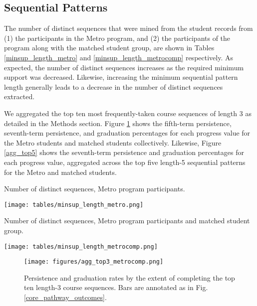 \documentclass[conference]{IEEEtran}
\begin{document}
\subsection{Sequential Patterns}

The number of distinct sequences that were mined from the student records from (1) the participants in the Metro program, and (2) the participants of the program along with the matched student group, are shown in Tables \ref{minsup_length_metro} and \ref{minsup_length_metrocomp} respectively. As expected, the number of distinct sequences increases as the required minimum support was decreased.  Likewise, increasing the minimum sequential pattern length generally leads to a decrease in the number of distinct sequences extracted.   

We aggregated the top ten most frequently-taken course sequences of length 3 as detailed in the Methods section.  Figure \ref{agg_top3} shows the fifth-term persistence, seventh-term persistence, and graduation percentages for each progress value for the Metro students and matched students collectively.  Likewise, Figure \ref{agg_top5} shows the seventh-term persistence and graduation percentages for each progress value, aggregated across the top five length-5 sequential patterns for the Metro and matched students.   

\begin{table}[ht]
\caption{Number of distinct sequences, Metro program participants.}
\texttt{[image: tables/minsup\_length\_metro.png]}
\label{minsup_length_metro}
\end{table}

\begin{table}[ht]
\caption{Number of distinct sequences, Metro program participants and matched student group.}
\texttt{[image: tables/minsup\_length\_metrocomp.png]}
\label{minsup_length_metrocomp}
\end{table}

\begin{figure}[htbp]
\texttt{[image: figures/agg\_top3\_metrocomp.png]}
\caption{Persistence and graduation rates by the extent of completing the top ten length-3 course sequences. Bars are annotated as in Fig. \ref{core_pathway_outcomes}.}
\label{agg_top3}
\end{figure}
\end{document}
